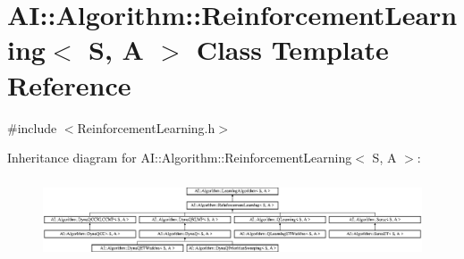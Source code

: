 \hypertarget{classAI_1_1Algorithm_1_1ReinforcementLearning}{\section{A\-I\-:\-:Algorithm\-:\-:Reinforcement\-Learning$<$ S, A $>$ Class Template Reference}
\label{classAI_1_1Algorithm_1_1ReinforcementLearning}
}


{\ttfamily \#include $<$Reinforcement\-Learning.\-h$>$}

Inheritance diagram for A\-I\-:\-:Algorithm\-:\-:Reinforcement\-Learning$<$ S, A $>$\-:\begin{figure}[H]
\begin{center}
\leavevmode
\includegraphics[height=2.397260cm]{classAI_1_1Algorithm_1_1ReinforcementLearning}
\end{center}
\end{figure}
